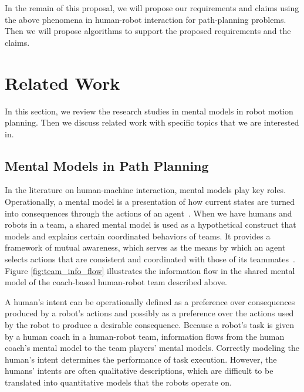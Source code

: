 \documentclass[phd]{byuprop}
\begin{document}
In the remain of this proposal, we will propose our requirements and claims using the above phenomena in human-robot interaction for path-planning problems.
Then we will propose algorithms to support the proposed requirements and the claims.

\section{Related Work}
\label{sec:related_work}

In this section, we review the research studies in mental models in robot motion planning.
Then we discuss related work with specific topics that we are interested in.

\subsection{Mental Models in Path Planning}
\label{sec:related_work:mental_models_in_path_planning}

In the literature on human-machine interaction, mental models play key roles.
Operationally, a mental model is a presentation of how current states are turned into consequences through the actions of an agent~\cite{gray2014manipulating}.
When we have humans and robots in a team, a shared mental model is used as a hypothetical construct that models and explains certain coordinated behaviors of teams.
It provides a framework of mutual awareness, which serves as the means by which an agent selects actions that are consistent and coordinated with those of its teammates~\cite{nikolaidis2012human,Yen_implementingshared,FSS149109,Jonker:2010:SMM:2018118.2018128,Neerincx2011,Mathieu2000,Kennedy2007}.
Figure \ref{fig:team_info_flow} illustrates the information flow in the shared mental model of the coach-based human-robot team described above.

A human's intent can be operationally defined as a preference over consequences produced by a robot's actions and possibly as a preference over the actions used by the robot to produce a desirable consequence.
Because a robot's task is given by a human coach in a human-robot team, information flows from the human coach's mental model to the team players' mental models.
Correctly modeling the human's intent determines the performance of task execution.
However, the humans' intents are often qualitative descriptions, which are difficult to be translated into quantitative models that the robots operate on.
\end{document}
